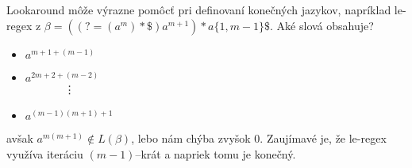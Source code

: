 Lookaround môže výrazne pomôcť pri definovaní konečných jazykov, napríklad le-regex z \cite[Poznámka 1.]{mojaBak}
$\beta = ((?=(a^m)*\mathdollar )a^{m+1})*a \lbrace 1,m-1 \rbrace \mathdollar$. Aké slová obsahuje?
\begin{itemize}
\item $a^{m+1+(m-1)}$
\item $a^{2m+2+(m-2)}$ \\
	  ~~~~~~~\vdots
\item $a^{(m-1)(m+1)+1}$
\end{itemize}
avšak $a^{m(m+1)} \notin L(\beta )$, lebo nám chýba zvyšok $0$. Zaujímavé je, že le-regex využíva iteráciu $(m-1)$--krát a napriek tomu je konečný.
